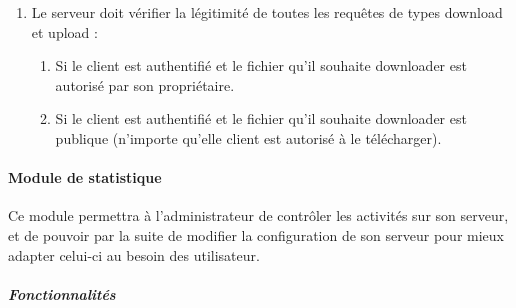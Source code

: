 \documentclass[10pt,a4paper]{report}
\begin{document}
	\begin{enumerate}
		\item Le serveur doit vérifier la légitimité de toutes les requêtes de types download et upload :
		\begin{enumerate}
			\item Si le client est authentifié et le fichier qu'il souhaite downloader est autorisé par son propriétaire.
			\item Si le client est authentifié et le fichier qu'il souhaite downloader est publique (n'importe qu'elle client est autorisé à le télécharger).
		\end{enumerate}
	\end{enumerate}
	
\paragraph{Module de statistique}
	Ce module permettra à l'administrateur de contrôler les activités sur son serveur, et 	de pouvoir par la suite de modifier la configuration de son serveur pour mieux adapter celui-ci au besoin des utilisateur.

	\subparagraph{Fonctionnalités}
\end{document}
